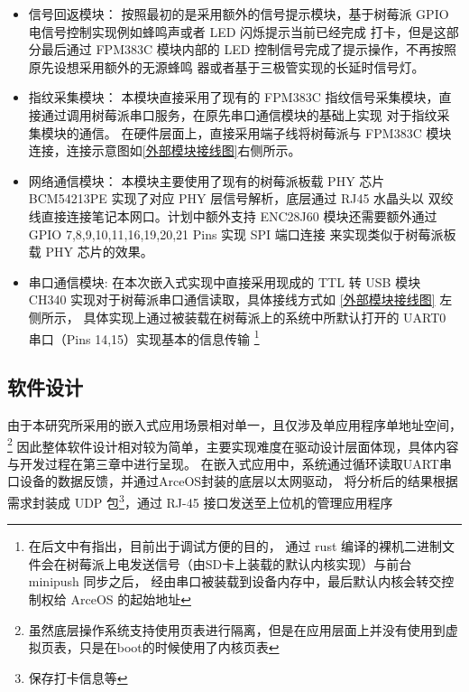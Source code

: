     \begin{itemize}
        \item 信号回返模块：
            按照最初的是采用额外的信号提示模块，基于树莓派 GPIO 电信号控制实现例如蜂鸣声或者 LED 闪烁提示当前已经完成
            打卡，但是这部分最后通过 FPM383C 模块内部的 LED 控制信号完成了提示操作，不再按照原先设想采用额外的无源蜂鸣
            器或者基于三极管实现的长延时信号灯。
        \item 指纹采集模块：
            本模块直接采用了现有的 FPM383C 指纹信号采集模块，直接通过调用树莓派串口服务，在原先串口通信模块的基础上实现
            对于指纹采集模块的通信。
            在硬件层面上，直接采用端子线将树莓派与 FPM383C 模块连接，连接示意图如\ref{外部模块接线图}右侧所示。
        \item 网络通信模块：
            本模块主要使用了现有的树莓派板载 PHY 芯片 BCM54213PE 实现了对应 PHY 层信号解析，底层通过 RJ45 水晶头以
            双绞线直接连接笔记本网口。计划中额外支持 ENC28J60 模块还需要额外通过 GPIO 7,8,9,10,11,16,19,20,21 Pins 实现 SPI 端口连接
            来实现类似于树莓派板载 PHY 芯片的效果。
        \item 串口通信模块:
            在本次嵌入式实现中直接采用现成的 TTL 转 USB 模块 CH340 实现对于树莓派串口通信读取，具体接线方式如 \ref{外部模块接线图} 左侧所示，
            具体实现上通过被装载在树莓派上的系统中所默认打开的 UART0 串口（Pins 14,15）实现基本的信息传输
            \footnote{在后文中有指出，目前出于调试方便的目的，
            通过 rust 编译的裸机二进制文件会在树莓派上电发送信号（由SD卡上装载的默认内核实现）与前台 minipush 同步之后，
            经由串口被装载到设备内存中，最后默认内核会转交控制权给 ArceOS 的起始地址}
    \end{itemize}

\subsection{软件设计}

    由于本研究所采用的嵌入式应用场景相对单一，且仅涉及单应用程序单地址空间，
    \footnote{虽然底层操作系统支持使用页表进行隔离，但是在应用层面上并没有使用到虚拟页表，只是在boot的时候使用了内核页表}
    因此整体软件设计相对较为简单，主要实现难度在驱动设计层面体现，具体内容与开发过程在第三章中进行呈现。
    在嵌入式应用中，系统通过循环读取UART串口设备的数据反馈，并通过ArceOS封装的底层以太网驱动，
    将分析后的结果根据需求封装成 UDP 包\footnote{保存打卡信息等}，通过 RJ-45 接口发送至上位机的管理应用程序


